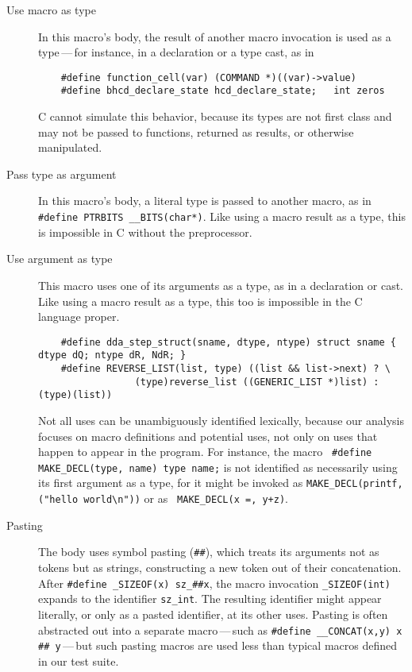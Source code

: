 \documentclass[10pt]{article}
\begin{document}
\begin{description}

\item[Use macro as type]
  In this macro's body, the result of another macro invocation is used as a
  type\,---\,for instance, in a declaration or a type cast, as in 
\begin{verbatim}
    #define function_cell(var) (COMMAND *)((var)->value)
    #define bhcd_declare_state hcd_declare_state;   int zeros
\end{verbatim}
  C cannot
  simulate this behavior, because its types are not first class and may not
  be passed to functions, returned as results, or otherwise manipulated.

\item[Pass type as argument]
  In this macro's body, a literal type is passed to another macro, as in
  {\tt \#define PTRBITS \verb|__BITS|(char*)}.  Like using a macro result
  as a type, this is impossible in C without the preprocessor.

\item[Use argument as type]
  This macro uses one of its arguments as a type, as in a declaration or
  cast.  Like using a macro result as a type, this too is impossible in the
  C language proper.
\begin{verbatim}
    #define dda_step_struct(sname, dtype, ntype) struct sname { dtype dQ; ntype dR, NdR; }
    #define REVERSE_LIST(list, type) ((list && list->next) ? \
                 (type)reverse_list ((GENERIC_LIST *)list) : (type)(list))
\end{verbatim}
  Not all uses can be unambiguously identified lexically, because our
  analysis focuses on macro definitions and potential uses, not only on
  uses that happen to appear in the program.  For instance, the macro {\tt
  \#define \verb|MAKE_DECL|(type, name) type name;} is not identified as
  necessarily using its first argument as a type, for it might be invoked as
  {\tt \verb|MAKE_DECL|(printf, ("hello world\verb|\|n"))} or as {\tt
  \verb|MAKE_DECL|(x =, y+z)}.

\item[Pasting]\label{def:pasting}
  The body uses symbol pasting ({\tt \#\#}), which treats its arguments not
  as tokens but as strings, constructing a new token out of their
  concatenation.  After {\tt \#define \verb|_SIZEOF|(x) \verb|sz_|\#\#x},
  the macro invocation {\tt \verb|_SIZEOF|(int)} expands to the 
  identifier {\tt \verb|sz_int|}.  The resulting identifier might appear literally, or
  only as a pasted identifier, at its other uses.  Pasting is often
  abstracted out into a separate macro\,---\,such as {\tt \#define
  \verb|__CONCAT|(x,y) x \#\# y}\,---\,but such pasting macros are used less
  than typical macros defined in our test suite.


\end{description}
\end{document}

